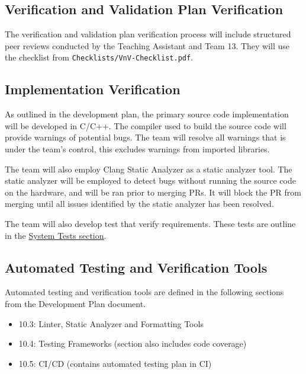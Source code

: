 \documentclass[12pt, titlepage]{article}
\begin{document}
\subsection{Verification and Validation Plan Verification}
\label{sec:vnv_plan_verification}

The verification and validation plan verification process will include
structured peer reviews conducted by the Teaching Assistant and Team 13.
They will use the checklist from \texttt{Checklists/VnV-Checklist.pdf}.

\subsection{Implementation Verification}\label{sec:implementation_verification}

As outlined in the development plan, the primary source code implementation
will be developed in C/C++. The compiler used to build the source code
will provide warnings of potential bugs. The team will resolve all
warnings that is under the team's control, this excludes warnings from
imported libraries. \newline

The team will also employ Clang Static Analyzer \cite{clangStaticAnalyzer} as
a static analyzer tool. The static analyzer will be employed to detect bugs
without running the source code on the hardware, and will be ran prior to
merging PRs. It will block the PR from merging until all issues identified by
the static analyzer has been resolved.

The team will also develop test that verify requirements. These tests are
outline in the \hyperref[sec:system_tests]{System Tests section}.

\subsection{Automated Testing and Verification Tools}
\label{sec:testing_tools}

Automated testing and verification tools are defined in the following sections
from the Development Plan document.

\begin{itemize}
  \item 10.3: Linter, Static Analyzer and Formatting Tools
  \item 10.4: Testing Frameworks (section also includes code coverage)
  \item 10.5: CI/CD (contains automated testing plan in CI)
\end{itemize}
\end{document}
